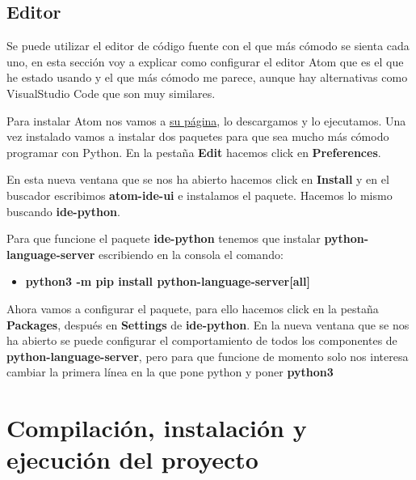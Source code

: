 \subsection{Editor}

Se puede utilizar el editor de código fuente con el que más cómodo se sienta cada uno, en esta sección voy a explicar como configurar el editor Atom que es el que he estado usando y el que más cómodo me parece, aunque hay alternativas como VisualStudio Code que son muy similares.

Para instalar Atom nos vamos a \href{https://atom.io/}{su página}, lo descargamos y lo ejecutamos. Una vez instalado vamos a instalar dos paquetes para que sea mucho más cómodo programar con Python. En la pestaña \textbf{Edit} hacemos click en \textbf{Preferences}.


En esta nueva ventana que se nos ha abierto hacemos click en \textbf{Install} y en el buscador escribimos \textbf{atom-ide-ui} e instalamos el paquete. Hacemos lo mismo buscando \textbf{ide-python}.

 

Para que funcione el paquete \textbf{ide-python} tenemos que instalar \textbf{python-language-server} escribiendo en la consola el comando:
\begin{itemize}
	\item \textbf{python3 -m pip install python-language-server[all]}
\end{itemize}


Ahora vamos a configurar el paquete, para ello hacemos click en la pestaña \textbf{Packages}, después en \textbf{Settings} de \textbf{ide-python}. En la nueva ventana que se nos ha abierto se puede configurar el comportamiento de todos los componentes de \textbf{python-language-server}, pero para que funcione de momento solo nos interesa cambiar la primera línea en la que pone python y poner \textbf{python3}

 


\section{Compilación, instalación y ejecución del proyecto}

